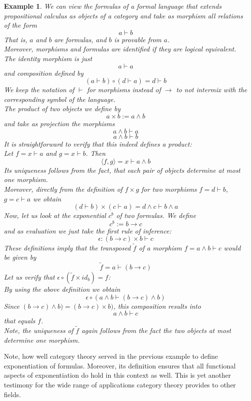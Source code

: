 \documentclass[17pt]{extarticle}
\newtheorem*{example*}{Example}
\begin{document}
\begin{example*}
	We can view the formulas of a formal language that extends propositional calculus as objects of a category and take as morphism all relations of the form
	$$a\vdash b$$
	That is, $a$ and $b$ are formulas, and $b$ is provable from $a$.\\
	Moreover, morphisms and formulas are identified if they are logical equivalent.\\
	The identity morphism is just
	$$a\vdash a$$
	and composition defined by
	$$
	(a\vdash b)\circ (d\vdash a) = d\vdash b
	$$
	We keep the notation of $\vdash$ for morphisms instead of $\rightarrow$ to not intermix with the corresponding symbol of the language.\\
	The product of two objects we define by
	$$a\times b:=a\wedge b$$
	and take as projection the morphisms
	$$a\wedge b\vdash a$$
	$$a\wedge b\vdash b$$
	It is straightforward to verify that this indeed defines a product:\\
	Let $f=x\vdash a$ and $g=x\vdash b$. Then
	$$\langle f, g\rangle = x\vdash a\wedge b$$ 
	Its uniqueness follows from the fact, that each pair of objects determine at most one morphism.\\
	Moreover, directly from the definition of $f\times g$ for two morphisms $f=d\vdash b$, $g=c\vdash a$ we obtain
	$$(d\vdash b)\times (c\vdash a)=d\wedge c\vdash b\wedge a$$
	Now, let us look at the exponential $c^b$ of two formulas. We define
	$$c^b:=b\rightarrow c$$
	and as evaluation we just take the first rule of inference:
	$$\epsilon: (b\rightarrow c)\times b\vdash c$$
	These definitions imply that the transposed $\tilde{f}$ of a morphism $f=a\wedge b\vdash c$
	would be given by
	$$\tilde{f}=a\vdash (b\rightarrow c)$$
	Let us verify that $\epsilon\circ(\tilde{f}\times id_b)=f$:\\
	By using the above definition we obtain
	$$\epsilon\circ(a\wedge b\vdash (b\rightarrow c)\wedge b)$$
	Since $(b\rightarrow c)\wedge b)=(b\rightarrow c)\times b)$, this composition results into
	$$a\wedge b\vdash c$$ 
	that equals $f$.\\
	Note, the uniqueness of $\tilde{f}$ again follows from the fact the two objects at most determine one morphism.
\end{example*}
Note, how well category theory served in the previous example to define exponentiation of formulas. Moreover, its definition ensures that all functional aspects of exponentiation do hold in this context as well.	This is yet another testimony for the wide range of applications category theory provides to other fields.
\end{document}
